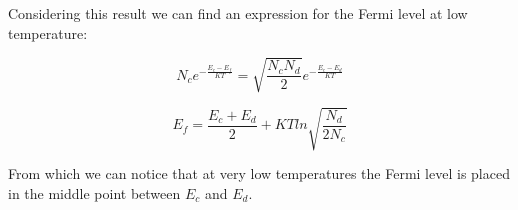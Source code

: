 			Considering this result we can find an expression for the Fermi level at low temperature:

			\begin{equation}
				N_ce^{-\frac{E_c-E_f}{KT}}=\sqrt{\frac{N_cN_d}{2}}e^{-\frac{E_c-E_d}{KT}}
			\end{equation}

			\begin{equation}
				E_f=\frac{E_c+E_d}{2}+KTln\sqrt{ \frac{N_d}{2N_c}}
			\end{equation}


			From which we can notice that at very low temperatures the Fermi level is placed in the middle point between $E_c$ and $E_d$.

			
